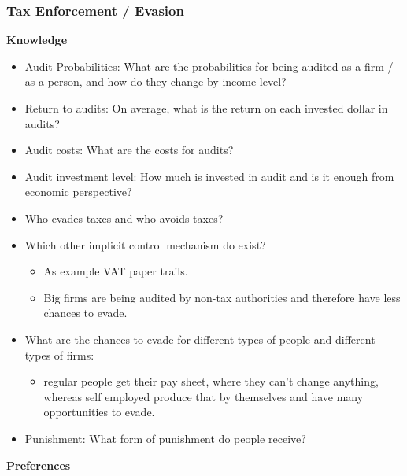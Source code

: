\documentclass[a4paper, 12pt]{article}
\begin{document}
\subsubsection{Tax Enforcement / Evasion}
\textbf{Knowledge}
\begin{itemize}
    \item Audit Probabilities: What are the probabilities for being audited as a firm / as a person, and how do they change by income level?
    \item Return to audits: On average, what is the return on each invested dollar in audits?  
    \item Audit costs: What are the costs for audits?
    \item Audit investment level: How much is invested in audit and is it enough from economic perspective?
    \item Who evades taxes and who avoids taxes? 
    \item Which other implicit control mechanism do exist? 
    \begin{itemize}
        \item As example VAT paper trails.
        \item Big firms are being audited by non-tax authorities and therefore have less chances to evade.
    \end{itemize}
    \item What are the chances to evade for different types of people and different types of firms: 
    \begin{itemize}
        \item regular people get their pay sheet, where they can't change anything, whereas self employed produce that by themselves and have many opportunities to evade.
    \end{itemize}
    \item Punishment: What form of punishment do people receive? 
\end{itemize}
\textbf{Preferences}
\end{document}
